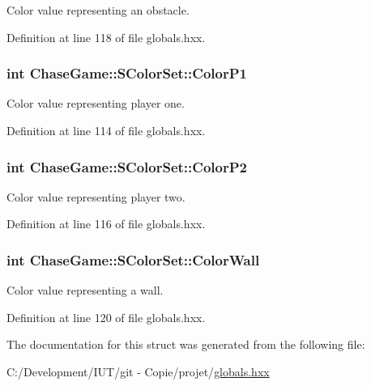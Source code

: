 Color value representing an obstacle. 



Definition at line 118 of file globals.\-hxx.

\hypertarget{struct_chase_game_1_1_s_color_set_a51e5a557359624fe92be93cb80621922}{
\subsubsection[{Color\-P1}]{\setlength{\rightskip}{0pt plus 5cm}int Chase\-Game\-::\-S\-Color\-Set\-::\-Color\-P1}}\label{struct_chase_game_1_1_s_color_set_a51e5a557359624fe92be93cb80621922}


Color value representing player one. 



Definition at line 114 of file globals.\-hxx.

\hypertarget{struct_chase_game_1_1_s_color_set_a777bce7519236b269ba44d921f54e4e8}{
\subsubsection[{Color\-P2}]{\setlength{\rightskip}{0pt plus 5cm}int Chase\-Game\-::\-S\-Color\-Set\-::\-Color\-P2}}\label{struct_chase_game_1_1_s_color_set_a777bce7519236b269ba44d921f54e4e8}


Color value representing player two. 



Definition at line 116 of file globals.\-hxx.

\hypertarget{struct_chase_game_1_1_s_color_set_a7a7a8dae118390ce5b4432aa4d99a474}{
\subsubsection[{Color\-Wall}]{\setlength{\rightskip}{0pt plus 5cm}int Chase\-Game\-::\-S\-Color\-Set\-::\-Color\-Wall}}\label{struct_chase_game_1_1_s_color_set_a7a7a8dae118390ce5b4432aa4d99a474}


Color value representing a wall. 



Definition at line 120 of file globals.\-hxx.



The documentation for this struct was generated from the following file\-:\begin{DoxyCompactItemize}
\item 
C\-:/\-Development/\-I\-U\-T/git -\/ Copie/projet/\hyperlink{globals_8hxx}{globals.\-hxx}\end{DoxyCompactItemize}
